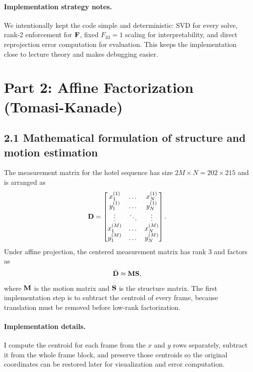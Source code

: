 {\paragraph{Implementation strategy notes.}
We intentionally kept the code simple and deterministic: SVD for every solve, rank-2 enforcement for $\mathbf{F}$, fixed $F_{33}=1$ scaling for interpretability, and direct reprojection error computation for evaluation. This keeps the implementation close to lecture theory and makes debugging easier.

\section*{Part 2: Affine Factorization (Tomasi-Kanade)}

\subsection*{2.1 Mathematical formulation of structure and motion estimation}
The measurement matrix for the hotel sequence has size $2M\times N=202\times215$ and is arranged as
\begin{equation}
\mathbf{D} =
\begin{bmatrix}
x_1^{(1)} & \dots & x_N^{(1)}\\
y_1^{(1)} & \dots & y_N^{(1)}\\
\vdots & \ddots & \vdots\\
x_1^{(M)} & \dots & x_N^{(M)}\\
y_1^{(M)} & \dots & y_N^{(M)}
\end{bmatrix}.
\end{equation}
Under affine projection, the centered measurement matrix has rank 3 and factors as
\begin{equation}
\tilde{\mathbf{D}} \approx \mathbf{M}\mathbf{S},
\end{equation}
where $\mathbf{M}$ is the motion matrix and $\mathbf{S}$ is the structure matrix. The first implementation step is to subtract the centroid of every frame, because translation must be removed before low-rank factorization.

\paragraph{Implementation details.}
I compute the centroid for each frame from the $x$ and $y$ rows separately, subtract it from the whole frame block, and preserve those centroids so the original coordinates can be restored later for visualization and error computation.

}
